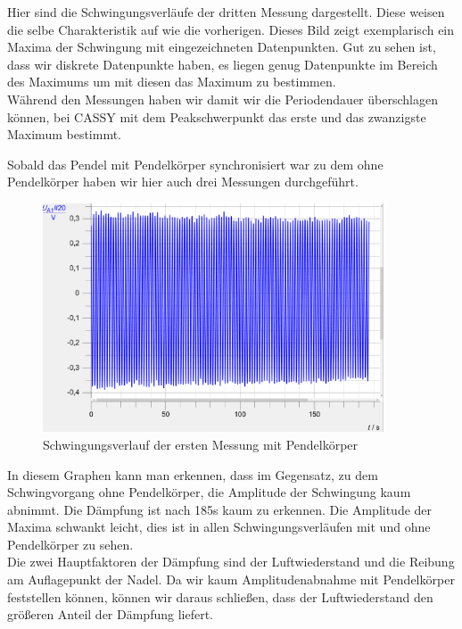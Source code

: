 \documentclass[twoside]{protokoll}
\begin{document}
Hier sind die Schwingungsverläufe der dritten Messung dargestellt. Diese weisen die selbe Charakteristik auf wie die vorherigen.
Dieses Bild zeigt exemplarisch ein Maxima der Schwingung mit eingezeichneten Datenpunkten. 
Gut zu sehen ist, dass wir diskrete Datenpunkte haben, es liegen genug Datenpunkte im Bereich des Maximums um mit diesen das Maximum zu bestimmen.\\
Während den Messungen haben wir damit wir die Periodendauer überschlagen können, bei CASSY mit dem Peakschwerpunkt das erste und das zwanzigste Maximum bestimmt.

Sobald das Pendel mit Pendelkörper synchronisiert war zu dem ohne Pendelkörper haben wir hier auch drei Messungen durchgeführt.
\begin{figure}[H]
    \centering
    \includegraphics[width=0.9\textwidth]{plots/gewicht-1-komplett.pdf}
    \caption{Schwingungsverlauf der ersten Messung mit Pendelkörper}
    \end{figure}

In diesem Graphen kann man erkennen, dass im Gegensatz, zu dem Schwingvorgang ohne Pendelkörper, die Amplitude der Schwingung kaum abnimmt.
Die Dämpfung ist nach 185s kaum zu erkennen.
Die Amplitude der Maxima schwankt leicht, dies ist in allen Schwingungsverläufen mit und ohne Pendelkörper zu sehen.\\

Die zwei Hauptfaktoren der Dämpfung sind der Luftwiederstand und die Reibung am Auflagepunkt der Nadel. 
Da wir kaum Amplitudenabnahme mit Pendelkörper feststellen können, können wir daraus schließen, dass der Luftwiederstand den größeren Anteil der Dämpfung liefert.
\end{document}
